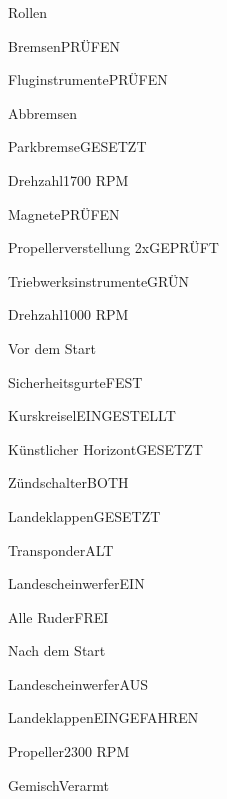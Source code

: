 \begin{task}
  \begin{checklist}{Rollen}
    \item{Bremsen}{PRÜFEN}
    \item{Fluginstrumente}{PRÜFEN}
  \end{checklist}
\end{task}

\begin{task}
  \begin{checklist}{Abbremsen}
    \item{Parkbremse}{GESETZT}
    \item{Drehzahl}{1700 RPM}
    \item{Magnete}{PRÜFEN}
    \item{Propellerverstellung 2x}{GEPRÜFT}
    \item{Triebwerksinstrumente}{GRÜN}
    \item{Drehzahl}{1000 RPM}
  \end{checklist}
\end{task}

\begin{task}
  \begin{checklist}{Vor dem Start}
    \item{Sicherheitsgurte}{FEST}
    \item{Kurskreisel}{EINGESTELLT}
    \item{Künstlicher Horizont}{GESETZT}
    \item{Zündschalter}{BOTH}
    \item{Landeklappen}{GESETZT}
    \item{Transponder}{ALT}
    \item{Landescheinwerfer}{EIN}
    \item{Alle Ruder}{FREI}
  \end{checklist}
\end{task}

\begin{task}
  \begin{checklist}{Nach dem Start}
    \item{Landescheinwerfer}{AUS}
    \item{Landeklappen}{EINGEFAHREN}
    \item{Propeller}{2300 RPM}
    \item{Gemisch}{Verarmt}
  \end{checklist}
\end{task}

